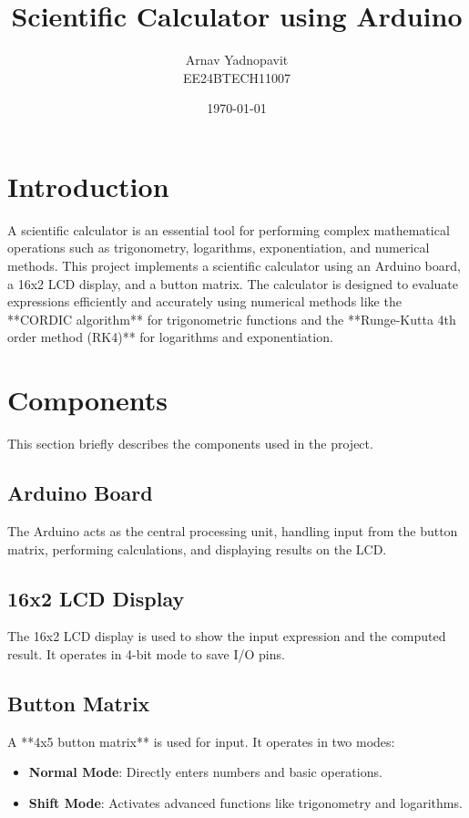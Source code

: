 \documentclass[a4paper,12pt]{article}
\title{\textbf{Scientific Calculator using Arduino}}
\author{Arnav Yadnopavit\\EE24BTECH11007}
\date{\today}
\begin{document}
\maketitle
\newpage
\tableofcontents

\newpage

\section{Introduction}
A scientific calculator is an essential tool for performing complex mathematical operations such as trigonometry, logarithms, exponentiation, and numerical methods. This project implements a scientific calculator using an Arduino board, a 16x2 LCD display, and a button matrix. The calculator is designed to evaluate expressions efficiently and accurately using numerical methods like the **CORDIC algorithm** for trigonometric functions and the **Runge-Kutta 4th order method (RK4)** for logarithms and exponentiation.

\section{Components}
This section briefly describes the components used in the project.

\subsection{Arduino Board}
The Arduino acts as the central processing unit, handling input from the button matrix, performing calculations, and displaying results on the LCD.

\subsection{16x2 LCD Display}
The 16x2 LCD display is used to show the input expression and the computed result. It operates in 4-bit mode to save I/O pins.

\subsection{Button Matrix}
A **4x5 button matrix** is used for input. It operates in two modes:
\begin{itemize}
    \item \textbf{Normal Mode}: Directly enters numbers and basic operations.
    \item \textbf{Shift Mode}: Activates advanced functions like trigonometry and logarithms.
\end{itemize}
\end{document}
